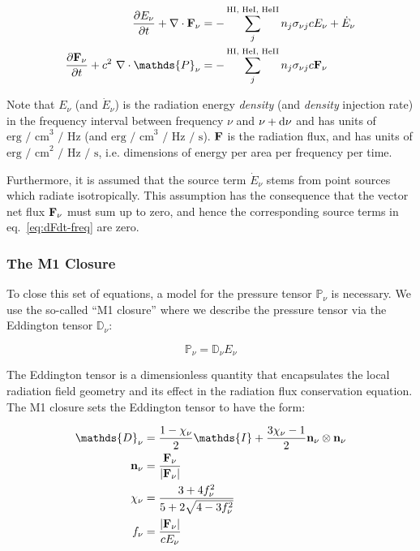 \begin{align}
	\DELDT{E_\nu} + \nabla \cdot \Fbf_\nu &=
		- \sum\limits_{j}^{\absorbers} n_j \sigma_{\nu j} c E_\nu + \dot{E}_\nu
		\label{eq:dEdt-freq} \\
	\DELDT{\Fbf_\nu} + c^2 \ \nabla \cdot \mathds{P}_\nu &=
		- \sum\limits_{j}^{\absorbers} n_j \sigma_{\nu j} c \Fbf_\nu
		\label{eq:dFdt-freq}
\end{align}



Note that $E_\nu$ (and $\dot{E}_\nu$) is the radiation energy \emph{density} (and \emph{density}
injection rate) in the frequency interval between frequency $\nu$ and $\nu + \mathrm{d} \nu$ and has
units of $\text{erg / cm}^3 \text{ / Hz}$ (and $\text{erg / cm}^3 \text{ / Hz / s}$).
$\mathbf{F}$ is the radiation flux, and has units of $\text{erg / cm}^2 \text{ / Hz / s}$, i.e.
dimensions of energy per area per frequency per time.

Furthermore, it is assumed that the source term $\dot{E}_\nu$ stems from point sources which radiate
isotropically. This assumption has the consequence that the vector net flux $\mathbf{F}_\nu$ must sum up
to zero, and hence the corresponding source terms in eq.~\ref{eq:dFdt-freq} are zero.



\subsubsection{The M1 Closure}



To close this set of equations, a model for the pressure tensor $\mathds{P}_\nu$ is necessary. We
use the so-called ``M1 closure'' \citep{levermoreRelatingEddingtonFactors1984a} where we describe
the pressure tensor via the Eddington tensor $\mathds{D}_\nu$:


\begin{equation*}
	\mathds{P}_\nu = \mathds{D}_\nu E_\nu
\end{equation*}

The Eddington tensor is a dimensionless quantity that encapsulates the local radiation field
geometry and its effect in the radiation flux conservation equation. The M1 closure sets the
Eddington tensor to have the form:

\begin{align*}
\mathds{D}_\nu &=
    \frac{1- \chi_\nu}{2} \mathds{I} + \frac{3 \chi_\nu - 1}{2} \mathbf{n}_\nu \otimes
    \mathbf{n}_\nu
    \label{eq:eddington-freq} \\
\mathbf{n}_\nu &=
    \frac{\Fbf_\nu}{|\Fbf_\nu|} \\
\chi_\nu &=
    \frac{3 + 4 f_\nu ^2}{5 + 2 \sqrt{4 - 3 f_\nu^2}} \\
f_\nu &=
    \frac{|\Fbf_\nu|}{c E_\nu}
\end{align*}












